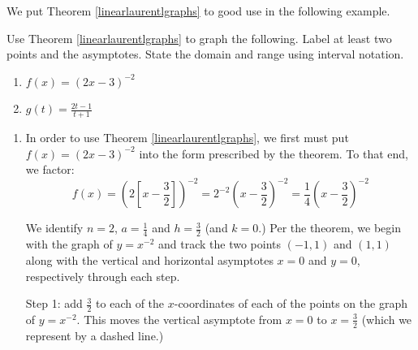 \documentclass{ximera}
\begin{document}
We put Theorem \ref{linearlaurentlgraphs} to good use in the following example.

\begin{example} \label{linearlaurentex} Use Theorem \ref{linearlaurentlgraphs} to graph the following.  Label at least two points and the asymptotes.  State the domain and range using interval notation.


\begin{enumerate}


\item  $f(x) = (2x-3)^{-2}$ 

\item  $g(t) = \frac{2t-1}{t+1}$

\end{enumerate}



\begin{explanation}

\begin{enumerate}

\item In order to use Theorem \ref{linearlaurentlgraphs}, we first must put $f(x) = (2x-3)^{-2}$ into the form prescribed by the theorem.  To that end, we factor:  \[f(x) = \left(2 \left[x  - \frac{3}{2} \right] \right)^{-2} = 2^{-2} \left(x - \frac{3}{2} \right)^{-2} = \frac{1}{4}  \left(x - \frac{3}{2} \right)^{-2}\]

We identify $n=2$, $a=\frac{1}{4}$ and $h = \frac{3}{2}$ (and $k =0$.)  Per the theorem, we begin with the graph of $y = x^{-2}$ and track the two points $(-1,1)$ and $(1,1)$ along with the vertical and horizontal asymptotes $x = 0$ and $y=0$, respectively through each step.

Step 1:   add $\frac{3}{2}$ to each of the $x$-coordinates of each of the points on the graph of $y=x^{-2}$.  This moves the vertical asymptote from $x = 0$ to $x = \frac{3}{2}$ (which we represent by a dashed line.)

\begin{center}
\begin{image}
\end{image}
\end{center}
\end{enumerate}
\end{explanation}
\end{example}
\end{document}
